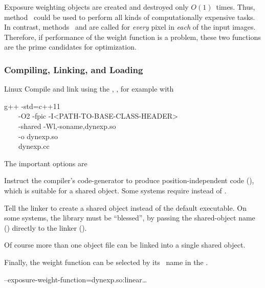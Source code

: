 Exposure weighting objects are created and destroyed only $O(1)$~times.  Thus,
method~ could be used to perform all kinds of computationally expensive tasks.
In contrast, methods~ and  are called for \emph{every} pixel in
\emph{each} of the input images.  Therefore, if performance of the weight function is a problem,
these two functions are the prime candidates for optimization.


\subsubsection[Compiling, Linking, and Loading]{\label{sec:compiling-linking-loading}%
  Compiling, Linking, and Loading}

\begin{restrictedmaterial}{Linux}
  \noindent Compile and link using the , ,
  for example with

  \begin{literal}
    g++ -std=c++11 \bslash \\
    ~~~~-O2 -fpic -I<PATH-TO-BASE-CLASS-HEADER> \bslash \\
    ~~~~-shared -Wl,-soname,dynexp.so \bslash \\
    ~~~~-o dynexp.so \bslash \\
    ~~~~dynexp.cc
  \end{literal}

  The important options are

  \begin{codelist}
  \item[\option{-fpic}]\itemend
    Instruct the compiler's code-generator to produce position\hyp{}independent code
    (), which is suitable for a shared object.  Some systems require 
    instead of .

  \item[\option{-shared}]\itemend
    Tell the linker to create a shared object instead of the default executable.  On some
    systems, the library must be ``blessed'', by passing the shared-object name
    () directly to the linker ().

    Of course more than one object file can be linked into a single shared object.
  \end{codelist}

  Finally, the weight function can be selected by its ~name in the
  .

  \begin{literal}
    \app{} --exposure-weight-function=dynexp.so:linear\dots
  \end{literal}
\end{restrictedmaterial}


